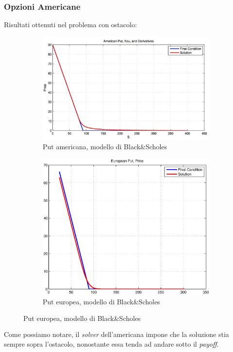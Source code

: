 \documentclass{beamer}
\begin{document}
\begin{frame}
\frametitle{Opzioni Americane}
Risultati ottenuti nel problema con ostacolo:
\begin{figure}
\begin{subfigure}{0.48\linewidth}
\centering
 \includegraphics[width=.9\linewidth]{img/us_put.jpg}
 \caption{Put americana, modello di Black\&Scholes}
 \end{subfigure}
 \hfill
 \begin{subfigure}{0.48\linewidth}
  \centering
  \includegraphics[width=0.9\linewidth]{test1-put1dprice.eps}
  \caption{Put europea, modello di Black\&Scholes}
 \end{subfigure}
 \end{figure}
 Come possiamo notare, il \emph{solver} dell'americana impone che la soluzione stia sempre sopra l'ostacolo, nonostante essa tenda ad andare sotto il \emph{payoff}.
\end{frame}
\end{document}
